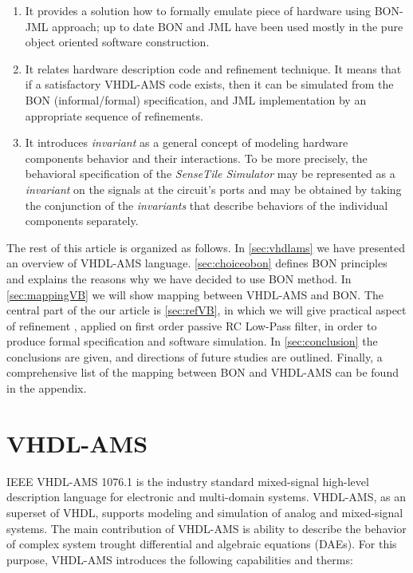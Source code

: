 \documentclass{article}
\newcommand{\STS}{\emph{SenseTile Simulator}\xspace}
\newcommand{\inv}{\emph{invariant}\xspace}
\begin{document}
\begin{enumerate}
\item
 It provides a solution how to formally emulate
 piece of hardware using BON-JML approach; up to date BON and JML
 have been used mostly in the pure object oriented software construction.   
\item
It relates hardware description code and refinement technique.
It means that if a satisfactory VHDL-AMS code exists, then it can be simulated  from the 
BON (informal/formal) specification, and JML implementation by an 
appropriate sequence of refinements.
\item
It introduces \inv as a general concept of modeling hardware 
components behavior and their interactions.
To be more precisely, the behavioral specification of the \STS may 
be represented as a \inv on the signals at the circuit's ports and 
may be obtained by taking the conjunction of the \emph{invariants} 
that describe behaviors of the individual components separately.\\ 
\end{enumerate}
The rest of this article is organized as follows.
In \autoref{sec:vhdlams} we have  presented an overview of VHDL-AMS language.
\autoref{sec:choiceobon} defines  BON principles and explains the
reasons why we have decided to use BON method.
In \autoref{sec:mappingVB} we will show mapping between VHDL-AMS and BON. 
The central part of the our article is \autoref{sec:refVB}, in which
we will give practical aspect of refinement , applied on 
first order passive RC Low-Pass filter, in order to produce formal 
specification and software simulation.
In \autoref{sec:conclusion} the conclusions are given,
and directions of future studies are outlined. Finally, a comprehensive list 
of the mapping between BON and VHDL-AMS can be found in the appendix. \\ 


\section{VHDL-AMS}
\label{sec:vhdlams}
IEEE VHDL-AMS 1076.1 is the industry standard mixed-signal
high-level description language for electronic and multi-domain
systems. VHDL-AMS, as an superset of VHDL, supports modeling and
simulation of analog and mixed-signal systems. The main contribution
of VHDL-AMS is ability to describe the behavior of complex system
trought differential and algebraic equations (DAEs). For this purpose,
VHDL-AMS introduces the following capabilities and therms:
\end{document}
